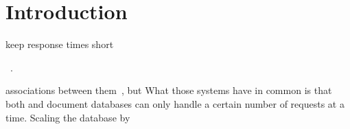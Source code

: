
\section{Introduction}
\label{sec:introduction}


\begin{commalist}
    \item keep response times short
\end{commalist}~\cite{nishtala2013facebook}.

associations between them~\cite{bronson2013tao,borthakur2013facebook}, but 
What those systems have in common is that both and document databases can only handle a certain number of requests at a time. Scaling the database by 


